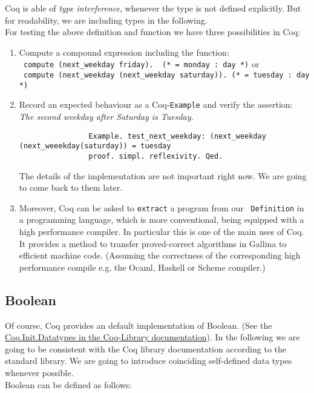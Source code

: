  Coq is able of {\itshape type  interference}, whenever the type is not defined explicitly.
  But for readability, we are including types in the following.\\   
  For testing the above definition and function we have three possibilities in Coq:
     
   \begin{enumerate}
   \item Compute a compound expression including the function:\\
 		 \lstinline! compute (next_weekday friday).  (* = monday : day *)! or \\
   		 \lstinline! compute (next_weekday (next_weekday saturday)). (* = tuesday : day *)!
   \item Record an expected behaviour as a Coq-\lstinline!Example! and verify the assertion:\\ 
         {\itshape The second weekday after Saturday is Tuesday.}  
   
		   \begin{lstlisting}
		   		Example. test_next_weekday: (next_weekday (next_weeekday(saturday)) = tuesday 
		   		proof. simpl. reflexivity. Qed.
		   \end{lstlisting}
   			The details of the implementation are not important right now. 
   			We are going to come back to them later.
   
   \item Moreover, Coq can be asked to \lstinline!extract! a program from our \lstinline! Definition! in a programming language, which is more conventional, being equipped with a high performance compiler.
    In particular this is one of the main uses of Coq. 
    It provides a method to transfer proved-correct algorithms in Gallina to efficient machine code.
    (Assuming the correctness of the corresponding high performance compile e.g. the Ocaml, Haskell or Scheme compiler.) 			
   \end{enumerate}   

    


\subsection{Boolean}

    Of course, Coq provides an default implementation of Boolean.
    (See the \newline \href{https://www.cs.princeton.edu/courses/archive/fall07/cos595/stdlib/html/Coq.Init.Datatypes.html}{Coq.Init.Datatypes in the Coq-Library documentation}).  
    In the following we are going to be consistent with the Coq library documentation according to the standard library.
    We are going to introduce coinciding self-defined data types whenever possible.\\
    Boolean can be defined as follows:
    
